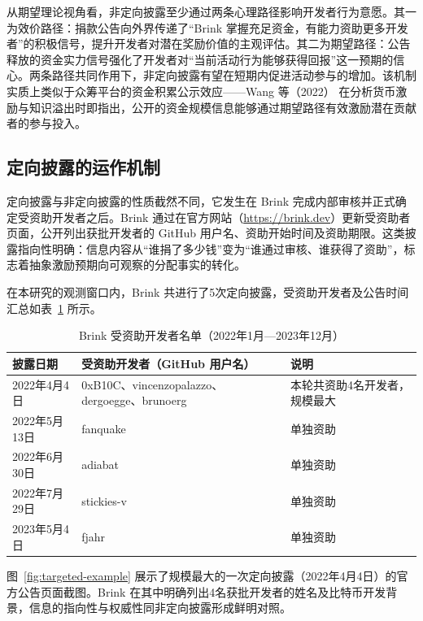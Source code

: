 从期望理论视角看，非定向披露至少通过两条心理路径影响开发者行为意愿。其一为效价路径：捐款公告向外界传递了“Brink 掌握充足资金，有能力资助更多开发者”的积极信号，提升开发者对潜在奖励价值的主观评估。其二为期望路径：公告释放的资金实力信号强化了开发者对“当前活动行为能够获得回报”这一预期的信心。两条路径共同作用下，非定向披露有望在短期内促进活动参与的增加。该机制实质上类似于众筹平台的资金积累公示效应——Wang 等（2022）\cite{wang2022monetary} 在分析货币激励与知识溢出时即指出，公开的资金规模信息能够通过期望路径有效激励潜在贡献者的参与投入。

\subsection{定向披露的运作机制}

定向披露与非定向披露的性质截然不同，它发生在 Brink 完成内部审核并正式确定受资助开发者之后。Brink 通过在官方网站（\url{https://brink.dev}）更新受资助者页面，公开列出获批开发者的 GitHub 用户名、资助开始时间及资助期限。这类披露指向性明确：信息内容从“谁捐了多少钱”变为“谁通过审核、谁获得了资助”，标志着抽象激励预期向可观察的分配事实的转化。

在本研究的观测窗口内，Brink 共进行了5次定向披露，受资助开发者及公告时间汇总如表~\ref{tab:grantees} 所示。

\begin{table}[htbp]
    \centering
    \caption{Brink 受资助开发者名单（2022年1月—2023年12月）}
    \label{tab:grantees}
    \begin{tabularx}{\textwidth}{p{3.2cm}Xp{5cm}}
        \toprule
        披露日期 & 受资助开发者（GitHub 用户名） & 说明 \\
        \midrule
        2022年4月4日  & 0xB10C、vincenzopalazzo、dergoegge、brunoerg & 本轮共资助4名开发者，规模最大 \\
        2022年5月13日 & fanquake & 单独资助 \\
        2022年6月30日 & adiabat   & 单独资助 \\
        2022年7月29日 & stickies-v & 单独资助 \\
        2023年5月4日  & fjahr      & 单独资助 \\
        \bottomrule
    \end{tabularx}
\end{table}

图~\ref{fig:targeted-example} 展示了规模最大的一次定向披露（2022年4月4日）的官方公告页面截图。Brink 在其中明确列出4名获批开发者的姓名及比特币开发背景，信息的指向性与权威性同非定向披露形成鲜明对照。

